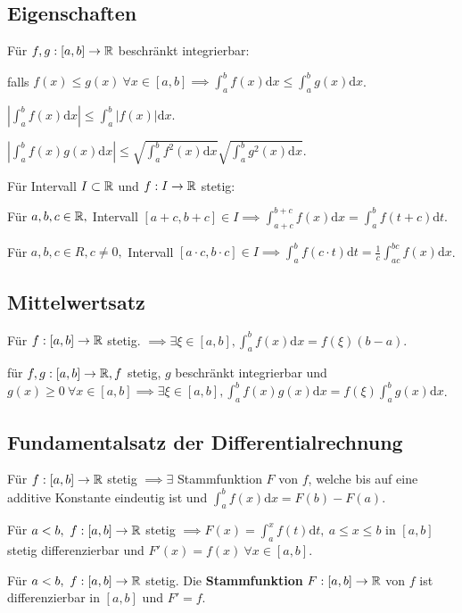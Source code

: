 \subsection{Eigenschaften}
Für $f, g: [a,b] \to \mathbb{R}$ beschränkt integrierbar:
\begin{compactitem}
    \item falls $f(x) \le g(x) \ \forall x \in [a,b] \implies \int_{a}^{b} f(x) \mathrm{d}x \le \int_{a}^{b} g(x) \mathrm{d}x$.
    \item $\left| \int_{a}^{b} f(x) \mathrm{d}x \right| \le \int_{a}^{b} \left| f(x) \right| \mathrm{d}x$.
    \item $\left| \int_{a}^{b} f(x)g(x) \mathrm{d}x \right| \le \sqrt{\int_{a}^{b} f^2(x) \mathrm{d}x}\sqrt{\int_{a}^{b} g^2(x) \mathrm{d}x}$.
    \item Für Intervall $I \subset \mathbb{R}$ und $f: I \to \mathbb{R}$ stetig:
        \begin{compactitem}
            \item Für $a,b,c \in \mathbb{R},$ Intervall $[a+c, b+c] \in I \implies \int_{a+c}^{b+c} f(x) \mathrm{d}x = \int_{a}^{b} f(t + c)\mathrm{d}t$.
            \item Für $a,b,c \in R, c \neq 0,$ Intervall $[a \cdot c, b \cdot c] \in I \implies \int_{a}^{b} f(c \cdot t) \mathrm{d}t = \frac{1}{c} \int_{ac}^{bc} f(x) \mathrm{d}x$.
        \end{compactitem}
\end{compactitem}

\subsection{Mittelwertsatz}
Für $f:[a,b] \to \mathbb{R}$ stetig. $\implies \exists \xi \in [a,b], \int_{a}^{b} f(x) \mathrm{d}x = f(\xi)(b-a)$.
\begin{compactitem}
\item für $f,g :[a,b] \to \mathbb{R}, f$ stetig, $g$ beschränkt integrierbar und $g(x) \ge 0 \ \forall x \in [a,b] \implies \exists \xi \in [a,b], \int_{a}^{b} f(x)g(x) \mathrm{d}x = f(\xi) \int_{a}^{b} g(x)\mathrm{d}x$.
\end{compactitem}

\subsection{Fundamentalsatz der Differentialrechnung}
Für $f:[a,b] \to \mathbb{R}$ stetig $\implies \exists$ Stammfunktion $F$ von $f$, welche bis auf eine additive Konstante eindeutig ist und $\int_{a}^{b} f(x) \mathrm{d}x = F(b) - F(a)$.
\begin{compactitem}
    \item Für $a < b, \ f:[a,b] \to \mathbb{R}$ stetig $\implies F(x) = \int_{a}^{x} f(t) \mathrm{d}t, \ a \le x \le b$ in $[a, b]$ stetig differenzierbar und $F'(x) = f(x) \ \forall x \in [a, b]$.
    \item Für $a < b, \ f:[a,b] \to \mathbb{R}$ stetig. Die \textbf{Stammfunktion} $F: [a,b] \to \mathbb{R}$ von $f$ ist differenzierbar in $[a,b]$ und $F'=f$.
\end{compactitem}

